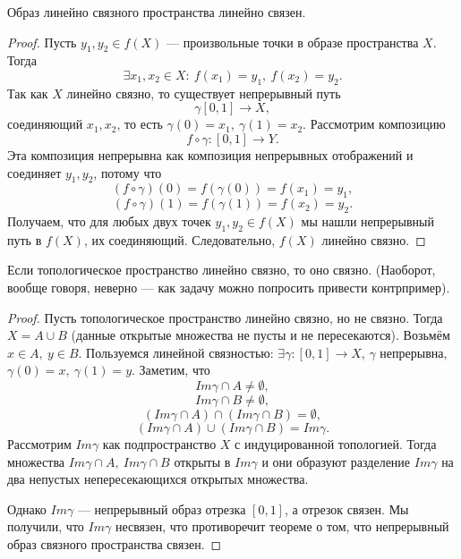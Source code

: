 \begin{statement}
    Образ линейно связного пространства линейно связен.
\end{statement}
\begin{proof}
    Пусть $y_1, y_2 \in f(X)$ — произвольные точки в образе пространства $X$. Тогда $$\exists x_1, x_2 \in X: \ f(x_1) = y_1, \ f(x_2) = y_2.$$
    Так как $X$ линейно связно, то существует непрерывный путь 
    \[\gamma [0,1] \to X,\]
    соединяющий $x_1, x_2$, то есть $\gamma(0) = x_1, \ \gamma(1) = x_2$.
Рассмотрим композицию
\[f \circ \gamma: [0,1] \to Y.\]
Эта композиция непрерывна как композиция непрерывных отображений и соединяет $y_1, y_2$, потому что 
\[(f \circ \gamma)(0) = f(\gamma(0)) = f(x_1) = y_1,\]
\[(f \circ \gamma)(1) = f(\gamma(1)) = f(x_2) = y_2.\]
Получаем, что для любых двух точек $y_1, y_2 \in f(X)$ мы нашли непрерывный путь в $f(X)$, их соединяющий. Следовательно, $f(X)$ линейно связно.
\end{proof}

\begin{statement}
    Если топологическое пространство линейно связно, то оно связно. (Наоборот, вообще говоря, неверно — как задачу можно попросить привести контрпример).
\end{statement}
\begin{proof}
    Пусть топологическое пространство линейно связно, но не связно. Тогда $X = A \cup B$ (данные открытые множества не пусты и не пересекаются). Возьмём $x \in A, \ y \in B$. Пользуемся линейной связностью: $\exists \gamma: [0, 1] \to X$, $\gamma$ непрерывна, $\gamma(0) = x, \ \gamma(1) = y$.
    Заметим, что $$Im \gamma \cap A \neq \emptyset,$$ 
    $$Im \gamma \cap B \neq \emptyset,$$
    $$(Im \gamma \cap A) \cap (Im \gamma \cap B) = \emptyset,$$
    $$(Im \gamma \cap A) \cup (Im \gamma \cap B) = Im \gamma.$$
    Рассмотрим $Im \gamma$ как подпространство $X$ с индуцированной топологией. Тогда множества $Im \gamma \cap A, \ Im \gamma \cap B$ открыты в $Im \gamma$ и они образуют разделение $Im \gamma$ на два непустых непересекающихся открытых множества.

    Однако $Im \gamma$ — непрерывный образ отрезка $[0,1]$, а отрезок связен. Мы получили, что $Im \gamma$ несвязен, что противоречит теореме о том, что непрерывный образ связного пространства связен.
\end{proof}

